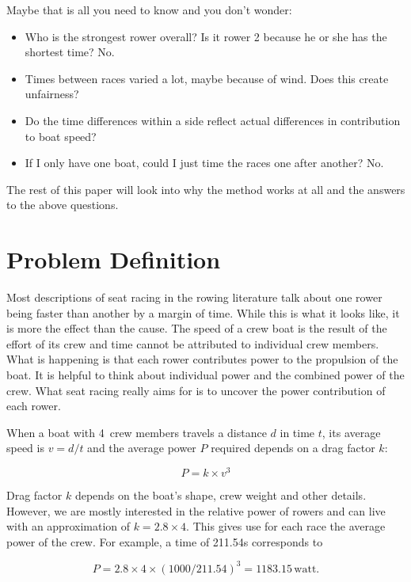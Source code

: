 \documentclass[a4paper,11pt]{article}
\begin{document}
Maybe that is all you need to know and you don't wonder:

\begin{itemize}
\item Who is the strongest rower overall? Is it rower 2 because he or
she has the shortest time? No.
\item Times between races varied a lot, maybe because of wind. Does this
create unfairness?
\item Do the time differences within a side reflect actual differences
in contribution to boat speed?
\item If I only have one boat, could I just time the races one after
another? No.
\end{itemize}

The rest of this paper will look into why the method works at all and
the answers to the above questions.
\fi

\section{Problem Definition}

Most descriptions of seat racing in the rowing literature talk about
one rower being faster than another by a margin of time. While this is
what it looks like, it is more the effect than the cause. The speed 
of a crew boat is the result of the effort of its crew and time cannot
be attributed to individual crew members. What is happening is that each
rower contributes power to the propulsion of the boat.  It is helpful to
think about individual power and the combined power of the crew. What
seat racing really aims for is to uncover the power contribution of each
rower.

When a boat with 4~crew members travels a distance $d$ in time $t$, its
average speed is $v=d/t$ and the average power $P$ required
depends on a drag factor $k$:

\begin{equation}
\label{eq:p=kv3}
P = k \times v^3
\end{equation}

Drag factor $k$ depends on the boat's shape, crew weight and other
details. However, we are mostly interested in the relative power of
rowers and can live with an approximation of $k = 2.8 \times 4$. This
gives use for each race the average power of the crew. For example, a
time of 211.54s corresponds to 

\begin{equation*}
P=2.8 \times 4 \times (1000/211.54)^3 = 1183.15\,\textrm{watt}.
\end{equation*}
\end{document}
